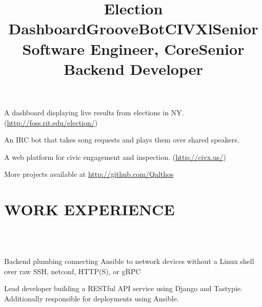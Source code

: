 \documentclass[line]{res}
\begin{document}
\begin{resume}
    \title{Election Dashboard}
    \begin{position}
        A dashboard displaying live results from elections in NY.
        (\url{http://foss.rit.edu/election/})
    \end{position}

    \title{GrooveBot}
    \begin{position}
        An IRC bot that takes song requests and plays them over shared speakers.
    \end{position}

    \title{CIVX}
    \begin{position}
        A web platform for civic engagement and inspection.
        (\url{http://civx.us/})
    \end{position}

    More projects available at \url{http://github.com/Qalthos}

\section{WORK EXPERIENCE}
    \begin{format}
        \title{l}\\
        \\
        \body{}
    \end{format}

    \title{Senior Software Engineer, Core}
    \begin{position}
        Backend plumbing connecting Ansible to network devices without a Linux
        shell over raw SSH, netconf, HTTP(S), or gRPC
    \end{position}

    \title{Senior Backend Developer}
    \begin{position}
        Lead developer building a RESTful API service using Django and Tastypie.
        Additionally responsible for deployments using Ansible.
    \end{position}


\end{resume}
\end{document}
